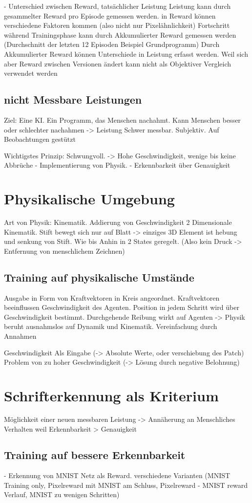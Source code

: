 - Unterschied zwischen Reward, tatsächlicher Leistung
  Leistung kann durch gesammelter Reward pro Episode gemessen werden. in Reward können verschiedene Faktoren kommen (also nicht nur Pixelähnlichkeit)
  Fortschritt während Trainingsphase kann durch Akkumulierter Reward gemessen werden (Durchschnitt der letzten 12 Episoden Beispiel Grundprogramm)
  Durch Akkumulierter Reward können Unterschiede in Leistung erfasst werden. Weil sich aber Reward zwischen Versionen ändert kann nicht als Objektiver Vergleich verwendet werden

\subsection*{nicht Messbare Leistungen}
Ziel: Eine KI. Ein Programm, das Menschen nachahmt. 
Kann Menschen besser oder schlechter nachahmen -> Leistung
Schwer messbar. Subjektiv. Auf Beobachtungen gestützt

Wichtigstes Prinzip: Schwungvoll. -> Hohe Geschwindigkeit, wenige bis keine Abbrüche
    - Implementierung von Physik. 
    - Erkennbarkeit über Genauigkeit



\section{Physikalische Umgebung}
Art von Physik: Kinematik. Addierung von Geschwindigkeit 2 Dimensionale
Kinematik. Stift bewegt sich nur auf Blatt -> einziges 3D Element ist hebung und
senkung von Stift. Wie bis Anhin in 2 States geregelt. (Also kein Druck -> Entfernung von menschlichem Zeichnen)

\subsection*{Training auf physikalische Umstände}
Ausgabe in Form von Kraftvektoren in Kreis angeordnet. Kraftvektoren
beeinflussen Geschwindigkeit des Agenten. Position in jedem Schritt wird über
Geschwindigkeit bestimmt. Durchgehende Reibung wirkt auf Agenten
-> Physik beruht ausnahmslos auf Dynamik und Kinematik. Vereinfachung durch Annahmen

Geschwindigkeit Als Eingabe (-> Absolute Werte, oder verschiebung des Patch)
Problem von zu hoher Geschwindigkeit (-> Lösung durch negative Belohnung)


\section{Schrifterkennung als Kriterium}
Möglichkeit einer neuen messbaren Leistung
-> Annäherung an Menschliches Verhalten weil Erkennbarkeit > Genauigkeit


\subsection*{Training auf bessere Erkennbarkeit}
- Erkennung von MNIST Netz als Reward. 
verschiedene Varianten (MNIST Training only, Pixelreward mit MNIST am Schluss, Pixelreward - MNIST reward Verlauf, MNIST zu wenigen Schritten)


